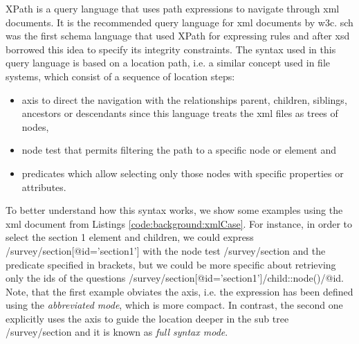 	XPath is a query language that uses path expressions to navigate through \gls{xml} documents. It is the recommended query language for \gls{xml} documents by \gls{w3c}. \gls{sch} was the first schema language that used XPath for expressing rules and after \gls{xsd} borrowed this idea to specify its integrity constraints. The syntax used in this query language is based on a location path, i.e. a similar concept used in file systems, which consist of a sequence of location steps:
	\begin{itemize}
		\item axis to direct the navigation with the relationships parent, children, siblings, ancestors or descendants \cite{web:w3caxes} since this language treats the \gls{xml} files as trees of nodes,
		\item node test that permits filtering the path to a specific node or element and
		\item predicates which allow selecting only those nodes with specific properties or attributes.
	\end{itemize}

	To better understand how this syntax works, we show some examples using the \gls{xml} document from Listings \ref{code:background:xmlCase}. For instance, in order to select the section 1 element and children, we could express /survey/section[@id='section1'] with the node test /survey/section and the predicate specified in brackets, but we could be more specific about retrieving only the ids of the questions /survey/section[@id='section1']/child::node()/@id. Note, that the first example obviates the axis, i.e. the expression has been defined using the \emph{abbreviated mode}, which is more compact. In contrast, the second one explicitly uses the axis to guide the location deeper in the sub tree /survey/section and it is known as \emph{full syntax mode}.